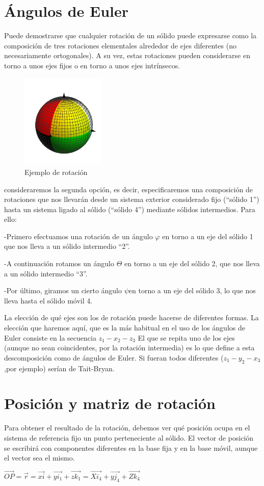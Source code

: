 \documentclass[12pt,a4paper]{report}
\begin{document}
\section{Ángulos de Euler}
Puede demostrarse que cualquier rotación de un sólido puede expresarse como la composición de tres rotaciones elementales alrededor de ejes diferentes (no necesariamente ortogonales). A su vez, estas rotaciones pueden considerarse en torno a unos ejes fijos o en torno a unos ejes intrínsecos.
\begin{figure}[hbtp]
\centering
\includegraphics[width=4cm]{1.png}
\caption{Ejemplo de rotación}
\end{figure}

consideraremos la segunda opción, es decir, especificaremos una composición de rotaciones que nos llevarán desde un sistema exterior considerado fijo (“sólido 1”) hasta un sistema ligado al sólido (“sólido 4”) mediante sólidos intermedios. Para ello:

-Primero efectuamos una rotación de un ángulo $\varphi$ en torno a un eje del sólido 1 que nos lleva a un sólido intermedio “2”.

-A continuación rotamos un ángulo $\Theta$ en torno a un eje del sólido 2, que nos lleva a un sólido intermedio “3”.

-Por último, giramos un cierto ángulo $\psi$en torno a un eje del sólido 3, lo que nos lleva hasta el sólido móvil 4.

La elección de qué ejes son los de rotación puede hacerse de diferentes formas. La elección que haremos aquí, que es la más habitual en el uso de los ángulos de Euler consiste en la secuencia $z_{1}-x_{2}-z_{3}$ El que se repita uno de los ejes (aunque no sean coincidentes, por la rotación intermedia) es lo que define a esta descomposición como de ángulos de Euler. Si fueran todos diferentes ($z_{1}-y_{2}-x_{3}$,por ejemplo) serían de Tait-Bryan.

\section{Posición y matriz de rotación}
Para obtener el resultado de la rotación, debemos ver qué posición ocupa en el sistema de referencia fijo un punto perteneciente al sólido. El vector de posición se escribirá con componentes diferentes en la base fija y en la base móvil, aunque el vector sea el mismo.
\begin{center}
$\overrightarrow{OP}=\overrightarrow{r}=\overrightarrow{xi}+\overrightarrow{yi_{1}}+\overrightarrow{zk_{1}}=\overrightarrow{Xi_{4}}+\overrightarrow{yj_{4}}+\overrightarrow{Zk_{4}}$
\end{center}
\end{document}
